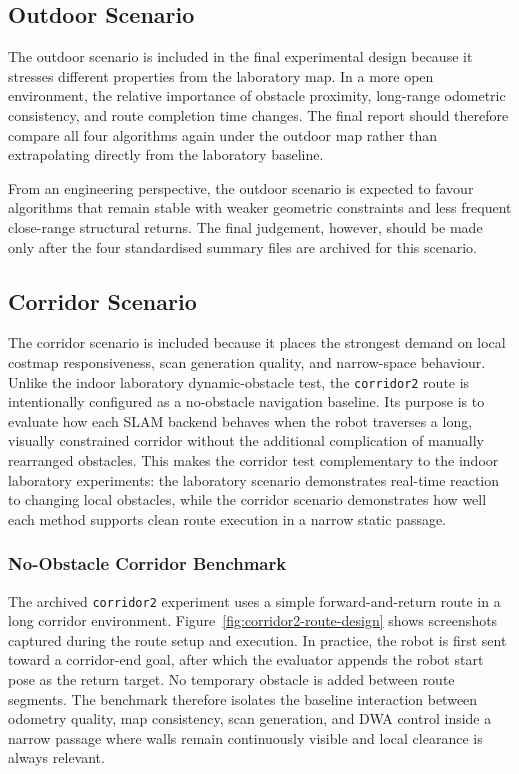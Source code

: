 \documentclass[12pt,a4paper]{report}
\begin{document}
\subsection{Outdoor Scenario}
The outdoor scenario is included in the final experimental design because it stresses different properties from the laboratory map. In a more open environment, the relative importance of obstacle proximity, long-range odometric consistency, and route completion time changes. The final report should therefore compare all four algorithms again under the outdoor map rather than extrapolating directly from the laboratory baseline.

From an engineering perspective, the outdoor scenario is expected to favour algorithms that remain stable with weaker geometric constraints and less frequent close-range structural returns. The final judgement, however, should be made only after the four standardised summary files are archived for this scenario.

\subsection{Corridor Scenario}
The corridor scenario is included because it places the strongest demand on local costmap responsiveness, scan generation quality, and narrow-space behaviour. Unlike the indoor laboratory dynamic-obstacle test, the \texttt{corridor2} route is intentionally configured as a no-obstacle navigation baseline. Its purpose is to evaluate how each SLAM backend behaves when the robot traverses a long, visually constrained corridor without the additional complication of manually rearranged obstacles. This makes the corridor test complementary to the indoor laboratory experiments: the laboratory scenario demonstrates real-time reaction to changing local obstacles, while the corridor scenario demonstrates how well each method supports clean route execution in a narrow static passage.

\subsubsection{No-Obstacle Corridor Benchmark}
The archived \texttt{corridor2} experiment uses a simple forward-and-return route in a long corridor environment. Figure~\ref{fig:corridor2-route-design} shows screenshots captured during the route setup and execution. In practice, the robot is first sent toward a corridor-end goal, after which the evaluator appends the robot start pose as the return target. No temporary obstacle is added between route segments. The benchmark therefore isolates the baseline interaction between odometry quality, map consistency, scan generation, and DWA control inside a narrow passage where walls remain continuously visible and local clearance is always relevant.
\end{document}
